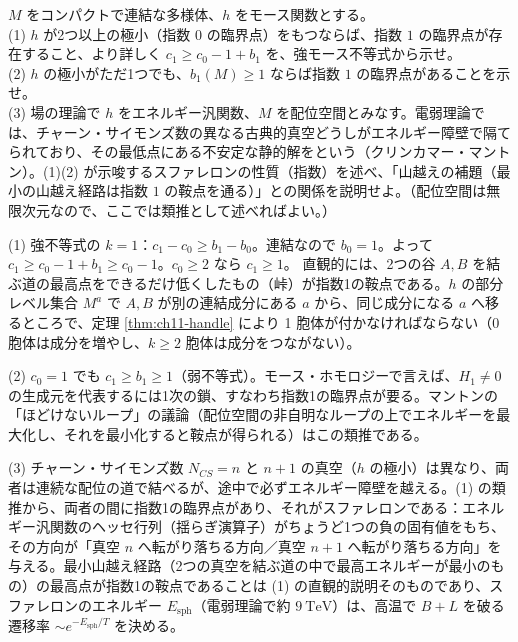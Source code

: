 \begin{problem}[難易度 B]\label{ch11-prob-sphaleron}
$M$ をコンパクトで連結な多様体、$h$ をモース関数とする。\\
(1) $h$ が2つ以上の極小（指数 $0$ の臨界点）をもつならば、指数 $1$ の臨界点が存在すること、より詳しく $c_1\ge c_0-1+b_1$ を、強モース不等式から示せ。\\
(2) $h$ の極小がただ1つでも、$b_1(M)\ge1$ ならば指数 $1$ の臨界点があることを示せ。\\
(3) 場の理論で $h$ をエネルギー汎関数、$M$ を配位空間とみなす。電弱理論では、チャーン・サイモンズ数の異なる古典的真空どうしがエネルギー障壁で隔てられており、その最低点にある不安定な静的解をという（クリンカマー・マントン）。(1)(2) が示唆するスファレロンの性質（指数）を述べ、「山越えの補題（最小の山越え経路は指数 $1$ の鞍点を通る）」との関係を説明せよ。（配位空間は無限次元なので、ここでは類推として述べればよい。）
\end{problem}

\begin{solution}
(1) 強不等式の $k=1$：$c_1-c_0\ge b_1-b_0$。連結なので $b_0=1$。よって $c_1\ge c_0-1+b_1\ge c_0-1$。$c_0\ge2$ なら $c_1\ge1$。
直観的には、2つの谷 $A,B$ を結ぶ道の最高点をできるだけ低くしたもの（峠）が指数1の鞍点である。$h$ の部分レベル集合 $M^a$ で $A,B$ が別の連結成分にある $a$ から、同じ成分になる $a$ へ移るところで、定理 \ref{thm:ch11-handle} により 1 胞体が付かなければならない（$0$ 胞体は成分を増やし、$k\ge2$ 胞体は成分をつながない）。

(2) $c_0=1$ でも $c_1\ge b_1\ge1$（弱不等式）。モース・ホモロジーで言えば、$H_1\neq0$ の生成元を代表するには1次の鎖、すなわち指数1の臨界点が要る。マントンの「ほどけないループ」の議論（配位空間の非自明なループの上でエネルギーを最大化し、それを最小化すると鞍点が得られる）はこの類推である。

(3) チャーン・サイモンズ数 $N_{CS}=n$ と $n+1$ の真空（$h$ の極小）は異なり、両者は連続な配位の道で結べるが、途中で必ずエネルギー障壁を越える。(1) の類推から、両者の間に指数1の臨界点があり、それがスファレロンである：エネルギー汎関数のヘッセ行列（揺らぎ演算子）がちょうど1つの負の固有値をもち、その方向が「真空 $n$ へ転がり落ちる方向／真空 $n+1$ へ転がり落ちる方向」を与える。最小山越え経路（2つの真空を結ぶ道の中で最高エネルギーが最小のもの）の最高点が指数1の鞍点であることは (1) の直観的説明そのものであり、スファレロンのエネルギー $E_{\mathrm{sph}}$（電弱理論で約 $9\ \mathrm{TeV}$）は、高温で $B+L$ を破る遷移率 $\sim e^{-E_{\mathrm{sph}}/T}$ を決める。
\end{solution}

